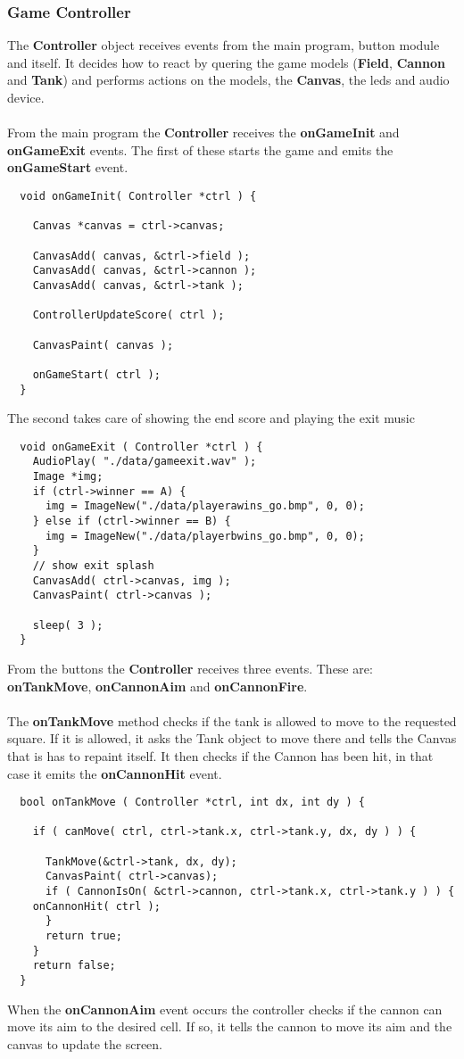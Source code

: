 \subsubsection{Game Controller}
The {\bf Controller} object receives events from the main program, button module and itself.
It decides how to react by quering the game models ({\bf Field}, {\bf Cannon} and {\bf Tank})
and performs actions on the models, the {\bf Canvas}, the leds and audio device.\\
\\
From the main program the {\bf Controller} receives the {\bf onGameInit} and {\bf onGameExit} events.
The first of these starts the game and emits the {\bf onGameStart} event.
\begin{lstlisting}
  void onGameInit( Controller *ctrl ) {

    Canvas *canvas = ctrl->canvas;

    CanvasAdd( canvas, &ctrl->field );
    CanvasAdd( canvas, &ctrl->cannon );
    CanvasAdd( canvas, &ctrl->tank );

    ControllerUpdateScore( ctrl );

    CanvasPaint( canvas );

    onGameStart( ctrl );
  }
\end{lstlisting}

The second takes care of showing the end score and playing the exit music
\begin{lstlisting}
  void onGameExit ( Controller *ctrl ) {
    AudioPlay( "./data/gameexit.wav" );
    Image *img;
    if (ctrl->winner == A) {
      img = ImageNew("./data/playerawins_go.bmp", 0, 0);
    } else if (ctrl->winner == B) {
      img = ImageNew("./data/playerbwins_go.bmp", 0, 0);
    }
    // show exit splash
    CanvasAdd( ctrl->canvas, img );
    CanvasPaint( ctrl->canvas );

    sleep( 3 );
  }
\end{lstlisting}
From the buttons the {\bf Controller} receives three events. These are: {\bf onTankMove},
{\bf onCannonAim} and {\bf onCannonFire}.\\
\\
The {\bf onTankMove} method checks if the tank is allowed to move to the requested square. If it is allowed, it asks the Tank object to move there and tells the Canvas that is has to repaint itself.
It then checks if the Cannon has been hit, in that case it emits the {\bf onCannonHit} event.

\begin{lstlisting}
  bool onTankMove ( Controller *ctrl, int dx, int dy ) {

    if ( canMove( ctrl, ctrl->tank.x, ctrl->tank.y, dx, dy ) ) {

      TankMove(&ctrl->tank, dx, dy);
      CanvasPaint( ctrl->canvas);
      if ( CannonIsOn( &ctrl->cannon, ctrl->tank.x, ctrl->tank.y ) ) {
	onCannonHit( ctrl );
      }
      return true;
    }
    return false;
  }
\end{lstlisting}
When the {\bf onCannonAim} event occurs the controller checks if the cannon can move its
aim to the desired cell. If so, it tells the cannon to move its aim and the canvas to update
the screen.

